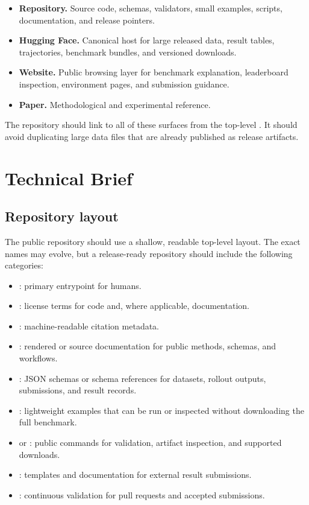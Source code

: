 \documentclass[11pt]{article}
\begin{document}
\begin{itemize}
\item \textbf{Repository.} Source code, schemas, validators, small examples, scripts, documentation, and release pointers.
\item \textbf{Hugging Face.} Canonical host for large released data, result tables, trajectories, benchmark bundles, and versioned downloads.
\item \textbf{Website.} Public browsing layer for benchmark explanation, leaderboard inspection, environment pages, and submission guidance.
\item \textbf{Paper.} Methodological and experimental reference.
\end{itemize}

The repository should link to all of these surfaces from the top-level .
It should avoid duplicating large data files that are already published as release artifacts.

\label{sec:public-repository-public-promise}

\section*{Technical Brief}

\label{sec:public-repository-layout}
\subsection*{Repository layout}

The public repository should use a shallow, readable top-level layout.
The exact names may evolve, but a release-ready repository should include the following categories:

\begin{itemize}
\item {}: primary entrypoint for humans.
\item {}: license terms for code and, where applicable, documentation.
\item {}: machine-readable citation metadata.
\item {}: rendered or source documentation for public methods, schemas, and workflows.
\item {}: JSON schemas or schema references for datasets, rollout outputs, submissions, and result records.
\item {}: lightweight examples that can be run or inspected without downloading the full benchmark.
\item {} or : public commands for validation, artifact inspection, and supported downloads.
\item {}: templates and documentation for external result submissions.
\item {}: continuous validation for pull requests and accepted submissions.
\end{itemize}
\end{document}
